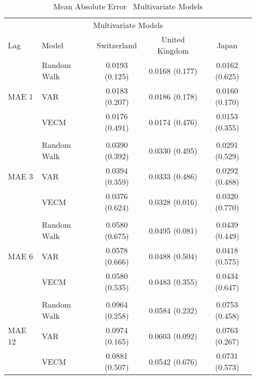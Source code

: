 \begin{table}[!h] %
  \centering
    \caption{Mean Absolute Error \textendash \ Multivariate Models}
  \begin{tabular}{llccc} %
    \toprule
    \multicolumn{5}{c}{Multivariate Models}                      \\
    \cmidrule(r){1-5}
    Lag                           &   Model                                     &Switzerland       & United Kingdom & Japan\\
    \midrule
    \multirow{3}{*}{MAE 1}        & \multicolumn{1}{l}{Random Walk}             &   0.0193 (0.125) & 0.0168 (0.177) & 0.0162 (0.625)\\
                                  & \multicolumn{1}{l}{VAR}                     &   0.0183 (0.207) & 0.0186 (0.178) & 0.0160 (0.170)\\ 
                                  & \multicolumn{1}{l}{VECM}                    &   0.0176 (0.491) & 0.0174 (0.476) & 0.0153 (0.355)\\
    \\
    \multirow{3}{*}{MAE 3}        & \multicolumn{1}{l}{Random Walk}             &   0.0390 (0.392) & 0.0330 (0.495) & 0.0291 (0.529)\\ 
                                  & \multicolumn{1}{l}{VAR}                     &   0.0394 (0.359) & 0.0333 (0.486) & 0.0292 (0.488)\\
                                  & \multicolumn{1}{l}{VECM}                    &   0.0376 (0.624) & 0.0328 (0.016) & 0.0320 (0.770)\\
                                                                             
    \\
    \multirow{3}{*}{MAE 6}        & \multicolumn{1}{l}{Random Walk}             &   0.0580 (0.675) & 0.0495 (0.081) & 0.0439 (0.449)\\
                                  & \multicolumn{1}{l}{VAR}                     &   0.0578 (0.666) & 0.0488 (0.504) & 0.0418 (0.575)\\
                                  & \multicolumn{1}{l}{VECM}                    &   0.0580 (0.535) & 0.0483 (0.355) & 0.0434 (0.647)\\
     \\
    \multirow{3}{*}{MAE 12}       & \multicolumn{1}{l}{Random Walk}             &   0.0964 (0.258) & 0.0584 (0.232) & 0.0753 (0.458)\\
                                  & \multicolumn{1}{l}{VAR}                     &   0.0974 (0.165) & 0.0603 (0.092) & 0.0763 (0.267)\\
                                  & \multicolumn{1}{l}{VECM}                    &   0.0881 (0.507) & 0.0542 (0.676) & 0.0731 (0.573)\\
    \bottomrule
  \end{tabular}
  \label{table:MAEmultivariate}
  \vspace{1em}  
\end{table}

